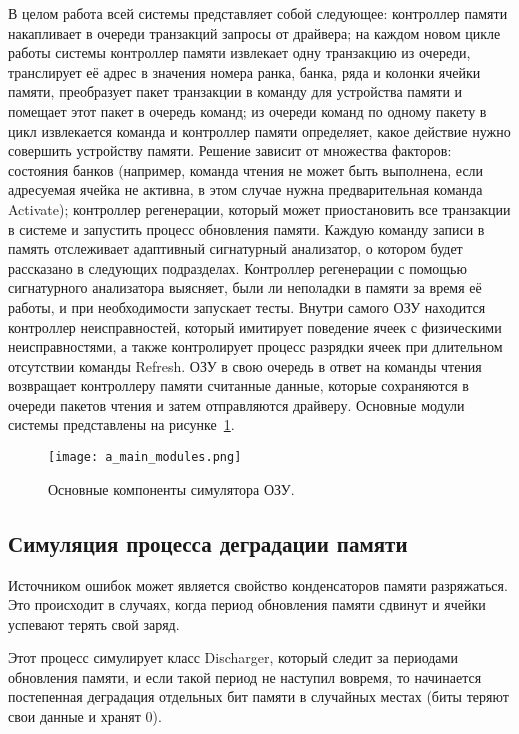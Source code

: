 В целом работа всей системы представляет собой следующее: контроллер памяти накапливает в очереди транзакций запросы от драйвера; на каждом новом цикле работы системы контроллер памяти извлекает одну транзакцию из очереди, транслирует её адрес в значения номера ранка, банка, ряда и колонки ячейки памяти, преобразует пакет транзакции в команду для устройства памяти и помещает этот пакет в очередь команд; из очереди команд по одному пакету в цикл извлекается команда и контроллер памяти определяет, какое действие нужно совершить устройству памяти. Решение  зависит от множества факторов: состояния банков (например, команда чтения не может быть выполнена, если адресуемая ячейка не активна, в этом случае нужна предварительная команда Activate); контроллер регенерации, который может приостановить все транзакции в системе и запустить процесс обновления памяти. Каждую команду записи в память отслеживает адаптивный сигнатурный анализатор, о котором будет рассказано в следующих подразделах. Контроллер регенерации с помощью сигнатурного анализатора выясняет, были ли неполадки в памяти за время её работы, и при необходимости запускает тесты. Внутри самого ОЗУ находится контроллер неисправностей, который имитирует поведение ячеек с физическими неисправностями, а также контролирует процесс разрядки ячеек при длительном отсутствии команды Refresh. ОЗУ в свою очередь в ответ на команды чтения возвращает контроллеру памяти считанные данные, которые сохраняются в очереди пакетов чтения и затем отправляются драйверу. Основные модули системы представлены на рисунке~\ref{fig:arch_and_mod:modules:main_modules}.

\begin{figure}[ht]
\centering
  \texttt{[image: a\_main\_modules.png]}  
  \caption{ Основные компоненты симулятора ОЗУ. }
  \label{fig:arch_and_mod:modules:main_modules}
\end{figure}

\subsection{Симуляция процесса деградации памяти}
\label{sub:arch_and_mod:memory_discharge}
Источником ошибок может является свойство конденсаторов памяти разряжаться. Это происходит в случаях, когда период обновления памяти сдвинут и ячейки успевают терять свой заряд.

Этот процесс симулирует класс Discharger, который следит за периодами обновления памяти, и если такой период не наступил вовремя, то начинается постепенная деградация отдельных бит памяти в случайных местах (биты теряют свои данные и хранят 0). 

